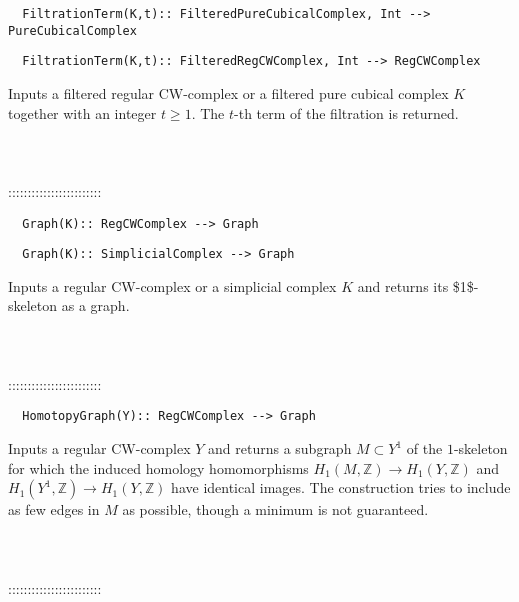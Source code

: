 \documentclass[a4paper,11pt]{report}
\begin{document}
{\begin{verbatim}  FiltrationTerm(K,t):: FilteredPureCubicalComplex, Int --> PureCubicalComplex
\end{verbatim}
 
\begin{verbatim}  FiltrationTerm(K,t):: FilteredRegCWComplex, Int --> RegCWComplex
\end{verbatim}
 

 

 Inputs a filtered regular CW-complex or a filtered pure cubical complex $K$ together with an integer $t \ge 1$. The $t$-th term of the filtration is returned. \\
 \\
 \\
 \\
 ::::::::::::::::::::::::\\
 
\begin{verbatim}  Graph(K):: RegCWComplex --> Graph
\end{verbatim}
 
\begin{verbatim}  Graph(K):: SimplicialComplex --> Graph
\end{verbatim}


 

 Inputs a regular CW-complex or a simplicial complex $K$ and returns its \$1\$-skeleton as a graph. \\
 \\
 \\
 \\
 ::::::::::::::::::::::::\\
 
\begin{verbatim}  HomotopyGraph(Y):: RegCWComplex --> Graph
\end{verbatim}


 

 Inputs a regular CW-complex $Y$ and returns a subgraph $M \subset Y^1$ of the $1$-skeleton for which the induced homology homomorphisms $H_1(M,\mathbb Z) \rightarrow H_1(Y,\mathbb Z)$ and $H_1(Y^1,\mathbb Z) \rightarrow H_1(Y,\mathbb Z)$ have identical images. The construction tries to include as few edges in $M$ as possible, though a minimum is not guaranteed. \\
 \\
 \\
 \\
 ::::::::::::::::::::::::\\
 
}
\end{document}
